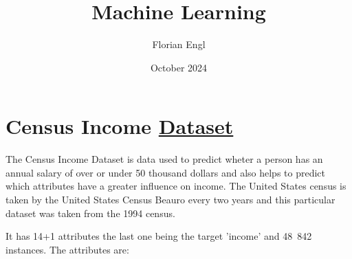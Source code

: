 \documentclass{article}[a4paper,12pt]
\title{Machine Learning}
\author{Florian Engl}
\date{October 2024}
\begin{document}
\maketitle

\section{Census Income \href{https://archive.ics.uci.edu/dataset/2/adult}{Dataset}}
    The Census Income Dataset is data used to predict wheter a person has an annual salary of over or under 50 thousand dollars and also helps to predict which attributes have a greater influence on income. The United States census is taken by the United States Census Beauro every two years and this particular dataset was taken from the 1994 census.
    \vspace{4mm}
    
    It has 14+1 attributes the last one being the target 'income' and 48~842 instances. The attributes are:
\end{document}
